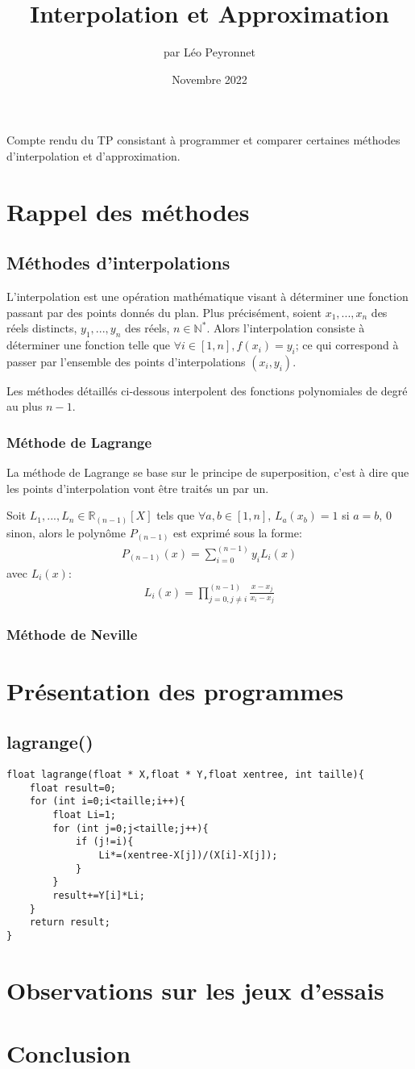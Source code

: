 \documentclass[10pt,a4paper,french]{article}
\author{par Léo Peyronnet}
\title{Interpolation et Approximation}
\date{Novembre 2022}
\begin{document}
\maketitle
Compte rendu du TP consistant à programmer et comparer certaines méthodes d'interpolation et d'approximation.
\section{Rappel des méthodes}
\subsection{Méthodes d'interpolations}
L'interpolation est une opération mathématique visant à déterminer une fonction passant par des points donnés du plan. Plus précisément, soient $x_1,...,x_n$ des réels distincts, $y_1,...,y_n$ des réels, $n \in \mathbb{N^*}$. Alors l'interpolation consiste à déterminer une fonction telle que $\forall i \in [1,n],f(x_i)=y_i$; ce qui correspond à passer par l'ensemble des points d'interpolations $(x_i,y_i)$.

Les méthodes détaillés ci-dessous interpolent des fonctions polynomiales de degré au plus $n-1$.
\subsubsection{Méthode de Lagrange}
La méthode de Lagrange se base sur le principe de superposition, c'est à dire que les points d'interpolation vont être traités un par un.

Soit $L_1,...,L_n \in \mathbb{R}_{(n-1)}[X]$ tels que $\forall a,b \in [1,n]$, $L_a(x_b)=1$ si $a=b$, $0$ sinon, alors le polynôme $P_{(n-1)}$ est exprimé sous la forme:
\begin{align*}
P_{(n-1)}(x)=\sum_{i=0}^{(n-1)}y_i L_i(x)
\end{align*}
avec $L_i(x)$:
\begin{align*}
L_i(x)=\prod_{j=0,j\neq i}^{(n-1)}\frac{x-x_j}{x_i-x_j}
\end{align*}
\subsubsection{Méthode de Neville}
\section{Présentation des programmes}
\subsection{lagrange()}
\begin{lstlisting}
float lagrange(float * X,float * Y,float xentree, int taille){
    float result=0;
    for (int i=0;i<taille;i++){ 
        float Li=1;
        for (int j=0;j<taille;j++){
            if (j!=i){
                Li*=(xentree-X[j])/(X[i]-X[j]);
            }
        }  
        result+=Y[i]*Li;
    }
    return result;
}
\end{lstlisting}
\section{Observations sur les jeux d'essais}
\section{Conclusion}
\end{document}
